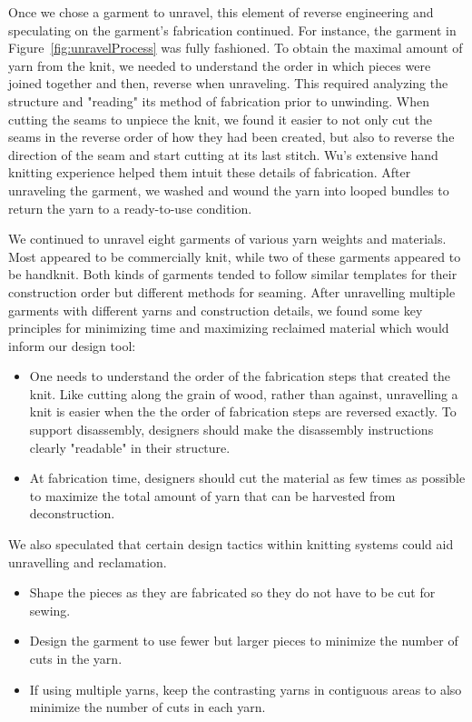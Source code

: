 \documentclass{sigchi}
\begin{document}
Once we chose a garment to unravel, this element of reverse engineering and speculating on the garment's fabrication continued. For instance, the garment in Figure~\ref{fig:unravelProcess} was fully fashioned. To obtain the maximal amount of yarn from the knit, we needed to understand the order in which pieces were joined together and then, reverse when unraveling. This required analyzing the structure and "reading" its method of fabrication prior to unwinding. When cutting the seams to unpiece the knit, we found it easier to not only cut the seams in the reverse order of how they had been created, but also to reverse the direction of the seam and start cutting at its last stitch. Wu's extensive hand knitting experience helped them intuit these details of fabrication. After unraveling the garment, we washed and wound the yarn into looped bundles to return the yarn to a ready-to-use condition.

We continued to unravel eight garments of various yarn weights and materials. Most appeared to be commercially knit, while two of these garments appeared to be handknit. Both kinds of garments tended to follow similar templates for their construction order but different methods for seaming. %
After unravelling multiple garments with different yarns and construction details, we found some key principles for minimizing time and maximizing reclaimed material which would inform our design tool: 

\begin{itemize}
    \item One needs to understand the order of the fabrication steps that created the knit. Like cutting along the grain of wood, rather than against, unravelling a knit is easier when the the order of fabrication steps are reversed exactly. To support disassembly, designers should make the disassembly instructions clearly "readable" in their structure.
    \item At fabrication time, designers should cut the material as few times as possible to maximize the total amount of yarn that can be harvested from deconstruction.
\end{itemize}

We also speculated that certain design tactics within knitting systems could aid unravelling and reclamation.
\begin{itemize}
    \item Shape the pieces as they are fabricated so they do not have to be cut for sewing.
    \item Design the garment to use fewer but larger pieces to minimize the number of cuts in the yarn.
    \item If using multiple yarns, keep the contrasting yarns in contiguous areas to also minimize the number of cuts in each yarn.
\end{itemize}
\end{document}
